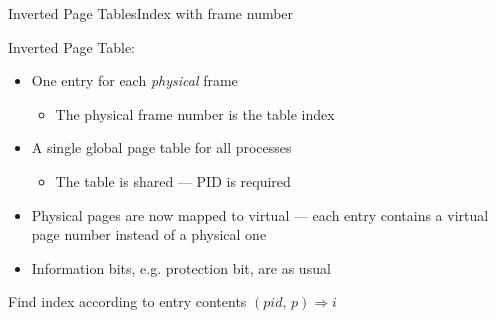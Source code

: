 \begin{frame}{Inverted Page Tables}{Index with frame number}
  \begin{block}{Inverted Page Table:}
    \begin{itemize}
    \item One entry for each \emph{physical} frame
      \begin{itemize}
      \item The physical frame number is the table index
      \end{itemize}
    \item A single global page table for all processes
      \begin{itemize}
      \item The table is shared --- PID is required
      \end{itemize}
    \end{itemize}
  \end{block}
  \begin{itemize}
  \item Physical pages are now mapped to virtual --- each entry contains a virtual page
    number instead of a physical one
  \item Information bits, e.g. protection bit, are as usual
  \end{itemize}
\end{frame}

\begin{frame}
  \begin{block}{Find index according to entry contents}
    $(pid,\,p)\Rightarrow{}i$
    \begin{center}
    \end{center}
  \end{block}
\end{frame}

